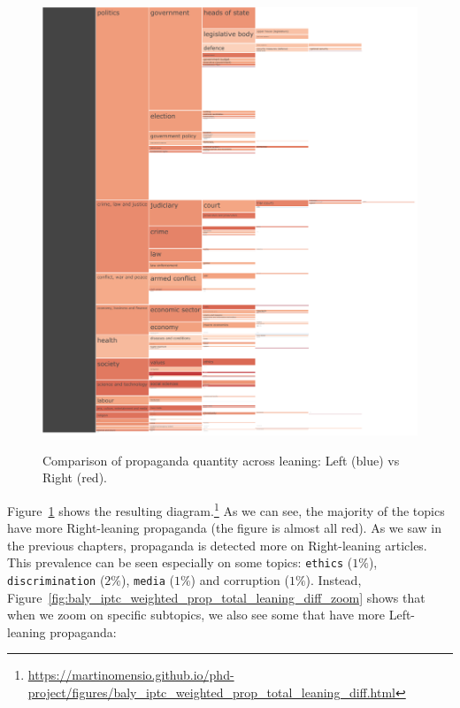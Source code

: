 \begin{figure}[!htbp]
    \centering
    \href{https://martinomensio.github.io/phd-project/figures/baly_iptc_weighted_prop_total_leaning_diff.html}{\includegraphics[trim={2.65cm 0cm 0cm 0cm},clip,width=\linewidth]{figures/baly_iptc_weighted_prop_total_leaning_diff.pdf}}
    \caption{Comparison of propaganda quantity across leaning: Left (blue) vs Right (red).}
    \label{fig:baly_iptc_weighted_prop_total_leaning_diff}
\end{figure}

Figure~\ref{fig:baly_iptc_weighted_prop_total_leaning_diff}
shows the resulting diagram.\footnote{\url{https://martinomensio.github.io/phd-project/figures/baly_iptc_weighted_prop_total_leaning_diff.html}}
As we can see, the majority of the topics have more Right-leaning propaganda (the figure is almost all red). As we saw in the previous chapters, propaganda is detected more on Right-leaning articles.
This prevalence can be seen especially on some topics: \texttt{ethics} ($1\%$), \texttt{discrimination} ($2\%$), \texttt{media} ($1\%$) and corruption ($1\%$).
Instead, Figure~\ref{fig:baly_iptc_weighted_prop_total_leaning_diff_zoom} shows that when we zoom on specific subtopics, we also see some that have more Left-leaning propaganda:

